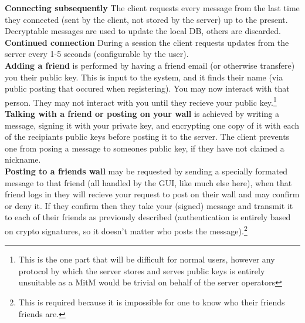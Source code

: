 \textbf{Connecting subsequently} The client requests every message from the last
time they connected (sent by the client, not stored by the server) up to the
present. Decryptable messages are used to update the local DB, others are
discarded.\\

\textbf{Continued connection} During a session the client requests updates from
the server every 1-5 seconds (configurable by the user).\\

\textbf{Adding a friend} is performed by having a friend email (or otherwise
transfere) you their public key. This is input to the system, and it finds their
name (via public posting that occured when registering). You may now interact
with that person. They may not interact with you until they recieve your public
key.\footnote{This is the one part that will be difficult for normal users,
however any protocol by which the server stores and serves public keys is
entirely unsuitable as a MitM would be trivial on behalf of the server
operators}\\

\textbf{Talking with a friend or posting on your wall} is achieved by writing
a message, signing it with your private key, and encrypting one copy of it with
each of the recipiants public keys before posting it to the server. The client
prevents one from posing a message to someones public key, if they have not
claimed a nickname.\\

\textbf{Posting to a friends wall} may be requested by sending a specially
formated message to that friend (all handled by the GUI, like much else here),
when that friend logs in they will recieve your request to post on their wall
and may confirm or deny it. If they confirm then they take your (signed) message
and transmit it to each of their friends as previously described (authentication
is entirely based on crypto signatures, so it doesn't matter who posts the
message).\footnote{This is required because it is impossible for one to know who
their friends friends are.}


